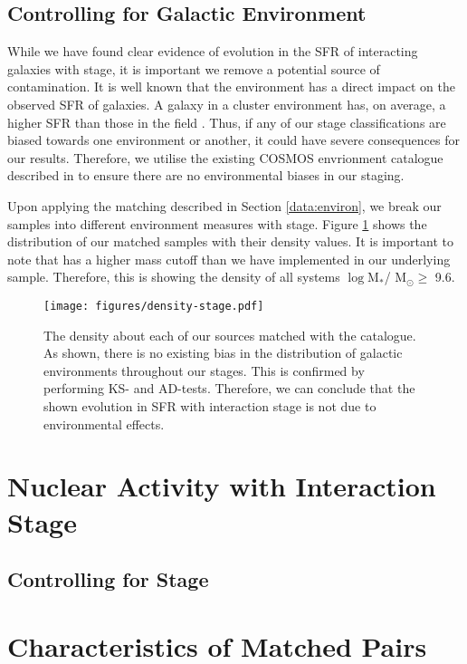 \documentclass[fleqn,usenatbib]{mnras}
\begin{document}
\subsection{Controlling for Galactic Environment} \label{sec:env-cont}
\noindent While we have found clear evidence of evolution in the SFR of interacting galaxies with stage, it is important we remove a potential source of contamination. It is well known that the environment has a direct impact on the observed SFR of galaxies. A galaxy in a cluster environment has, on average, a higher SFR than those in the field \citep{Papers on environment with SFR}. Thus, if any of our stage classifications are biased towards one environment or another, it could have severe consequences for our results. Therefore, we utilise the existing COSMOS envrionment catalogue described in \citet{2017ApJ...837...16D} to ensure there are no environmental biases in our staging. 

Upon applying the matching described in Section \ref{data:environ}, we break our samples into different environment measures with stage. Figure \ref{fig:dens-stage} shows the distribution of our matched samples with their density values. It is important to note that \citet{2017ApJ...837...16D} has a higher mass cutoff than we have implemented in our underlying sample. Therefore, this is showing the density of all systems $\log$M$_*$/ M$_\odot \geq$ 9.6. 

\begin{figure}
    \centering
    \texttt{[image: figures/density-stage.pdf]}
    \caption{The density about each of our sources matched with the \citet{2017ApJ...837...16D} catalogue. As shown, there is no existing bias in the distribution of galactic environments throughout our stages. This is confirmed by performing KS- and AD-tests. Therefore, we can conclude that the shown evolution in SFR with interaction stage is not due to environmental effects.}
    \label{fig:dens-stage}
\end{figure}

\section{Nuclear Activity with Interaction Stage}
\subsection{Controlling for Stage}

\section{Characteristics of Matched Pairs}
\end{document}
